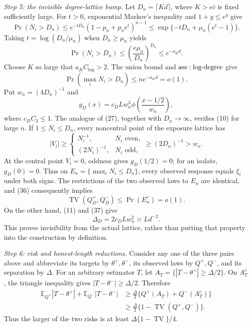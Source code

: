 \textit{Step 5: the invisible degree-lattice bump.}
Let \(D_n=\lceil Kd\rceil\), where \(K>e\bar c\) is fixed sufficiently large.  For \(t>0\), exponential Markov's inequality and \(1+y\leq e^y\) give
\[
 \Pr(N_i>D_n)
 \leq e^{-tD_n}(1-p_n+p_ne^t)^{n-1}
 \leq\exp\{-tD_n+\mu_n(e^t-1)\}.
\]
Taking \(t=\log(D_n/\mu_n)\) when \(D_n\geq\mu_n\) yields
\[
 \Pr(N_i>D_n)\leq\left(\frac{e\mu_n}{D_n}\right)^{D_n}
 \leq e^{-a_Kd}.
\tag{35}
\]
Choose \(K\) so large that \(a_KC_{\log}>2\).  The union bound and \({\rm ass:log\text{-}degree}\) give
\[
 \Pr\left(\max_iN_i>D_n\right)
 \leq ne^{-a_Kd}=o(1).
\tag{36}
\]
Put \(w_n=(4D_n)^{-1}\) and
\[
 g_D(x)=c_D Lw_n^3\phi\!\left(\frac{x-1/2}{w_n}\right),
\tag{37}
\]
where \(c_DC_3\leq1\).  The analogue of (27), together with \(D_n\to\infty\), verifies (10) for large \(n\).  If \(1\leq N_i\leq D_n\), every noncentral point of the exposure lattice has
\[
 |V_i|\geq\begin{cases}N_i^{-1},&N_i\text{ even},\\(2N_i)^{-1},&N_i\text{ odd},\end{cases}
 \geq(2D_n)^{-1}>w_n.
\tag{38}
\]
At the central point \(V_i=0\), oddness gives \(g_D(1/2)=0\); for an isolate, \(g_D(0)=0\).  Thus on \(E_n=\{\max_iN_i\leq D_n\}\), every observed response equals \(\xi_i\) under both signs.  The restrictions of the two observed laws to \(E_n\) are identical, and (36) consequently implies
\[
 \operatorname{TV}(Q_D^+,Q_D^-)
 \leq\Pr(E_n^c)=o(1).
\tag{39}
\]
On the other hand, (11) and (37) give
\[
 \Delta_D=2c_D Lw_n^2\asymp Ld^{-2}.
\tag{40}
\]
This proves invisibility from the actual lattice, rather than putting that property into the construction by definition.

\textit{Step 6: risk and honest-length reductions.}
Consider any one of the three pairs above and abbreviate its targets by \(\theta^+,\theta^-\), its observed laws by \(Q^+,Q^-\), and its separation by \(\Delta\).  For an arbitrary estimator \(T\), let \(A_T=\{|T-\theta^+|\geq\Delta/2\}\).  On \(A_T^c\), the triangle inequality gives \(|T-\theta^-|\geq\Delta/2\).  Therefore
\[
 \begin{aligned}
 \mathbb E_{Q^+}|T-\theta^+|+\mathbb E_{Q^-}|T-\theta^-|
 &\geq\frac\Delta2\{Q^+(A_T)+Q^-(A_T^c)\}\\
 &\geq\frac\Delta2\{1-\operatorname{TV}(Q^+,Q^-)\}.
 \end{aligned}
\tag{41}
\]
Thus the larger of the two risks is at least \(\Delta\{1-\operatorname{TV}\}/4\).

